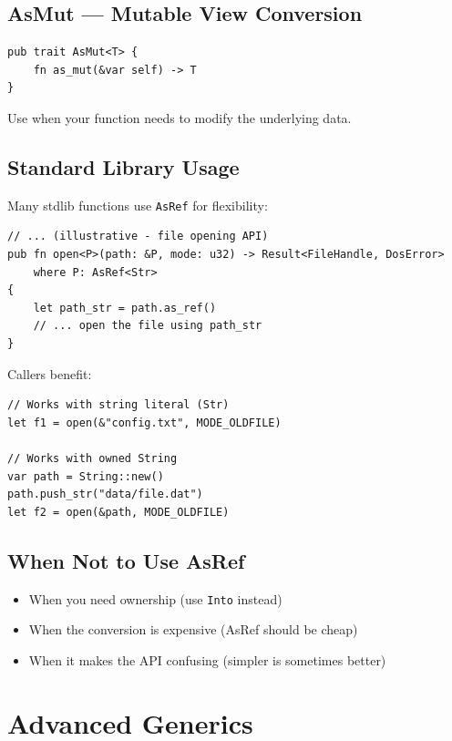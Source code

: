 \subsection{AsMut --- Mutable View Conversion}

\begin{lstlisting}
pub trait AsMut<T> {
    fn as_mut(&var self) -> T
}
\end{lstlisting}

Use when your function needs to modify the underlying data.

\subsection{Standard Library Usage}

Many stdlib functions use \texttt{AsRef} for flexibility:

\begin{lstlisting}
// ... (illustrative - file opening API)
pub fn open<P>(path: &P, mode: u32) -> Result<FileHandle, DosError>
    where P: AsRef<Str>
{
    let path_str = path.as_ref()
    // ... open the file using path_str
}
\end{lstlisting}

Callers benefit:

\begin{lstlisting}
// Works with string literal (Str)
let f1 = open(&"config.txt", MODE_OLDFILE)

// Works with owned String
var path = String::new()
path.push_str("data/file.dat")
let f2 = open(&path, MODE_OLDFILE)
\end{lstlisting}

\subsection{When Not to Use AsRef}

\begin{itemize}
    \item When you need ownership (use \texttt{Into} instead)
    \item When the conversion is expensive (AsRef should be cheap)
    \item When it makes the API confusing (simpler is sometimes better)
\end{itemize}


\section{Advanced Generics}
\label{sec:advanced-generics}

